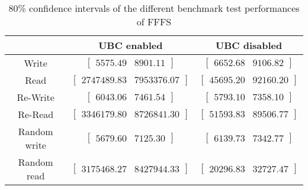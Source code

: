 
	\begin{table}
	\caption{80\% confidence intervals of the different benchmark test performances of FFFS}
	\begin{tabular}{| c | c | c |}
	\hline
	{} & \textbf{UBC enabled} & \textbf{UBC disabled} \\
	\hline
	\hline
	Write &$\left[ \begin{array}{rr} 5575.49 & 8901.11 \end{array}\right] $ &$\left[ \begin{array}{rr} 6652.68 & 9106.82 \end{array}\right] $\\ 
Read &$\left[ \begin{array}{rr} 2747489.83 & 7953376.07 \end{array}\right] $ &$\left[ \begin{array}{rr} 45695.20 & 92160.20 \end{array}\right] $\\ 
Re-Write &$\left[ \begin{array}{rr} 6043.06 & 7461.54 \end{array}\right] $ &$\left[ \begin{array}{rr} 5793.10 & 7358.10 \end{array}\right] $\\ 
Re-Read &$\left[ \begin{array}{rr} 3346179.80 & 8726841.30 \end{array}\right] $ &$\left[ \begin{array}{rr} 51593.83 & 89506.77 \end{array}\right] $\\ 
Random write &$\left[ \begin{array}{rr} 5679.60 & 7125.30 \end{array}\right] $ &$\left[ \begin{array}{rr} 6139.73 & 7342.77 \end{array}\right] $\\ 
Random read &$\left[ \begin{array}{rr} 3175468.27 & 8427944.33 \end{array}\right] $ &$\left[ \begin{array}{rr} 20296.83 & 32727.47 \end{array}\right] $\\ 

		\hline
		\end{tabular}
		\label{tbl:bootstrap-table-fffs}
		\end{table}
	